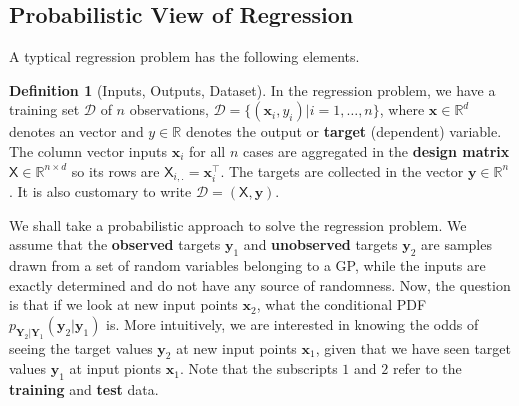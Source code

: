 \documentclass[10pt]{article}
\theoremstyle{definition}
\newtheorem{defn}{Definition}[section]
\theoremstyle{definition}
\theoremstyle{remark}
\begin{document}
\subsection{Probabilistic View of Regression}
A typtical regression problem has the following elements.
\begin{defn}[Inputs, Outputs, Dataset]
In the regression problem, we have a training set $\mathcal{D}$ of $n$ observations, $\mathcal{D}=\{(\mathbf{x}_i, y_i)|i=1,\dots,n\}$, where $\mathbf{x}\in\mathbb{R}^{d}$ denotes an  vector and $y\in\mathbb{R}$ denotes the output or \textbf{target} (dependent) variable. The column vector inputs $\mathbf{x}_i$ for all $n$ cases are aggregated in the \textbf{design matrix} $\mathsf{X}\in \mathbb{R}^{n\times d}$ so its rows are $\mathsf{X}_{i,.}=\mathbf{x}_i^{\top}$. The targets are collected in the vector $\mathbf{y}\in\mathbb{R}^n$. It is also customary to write $\mathcal{D}=(\mathsf{X}, \mathbf{y})$.
\end{defn}
We shall take a probabilistic approach to solve the regression problem. We assume that the \textbf{observed} targets $\mathbf{y}_1$ and \textbf{unobserved} targets $\mathbf{y}_2$ are samples drawn from a set of random variables belonging to a GP, while the inputs are exactly determined and do not have any source of randomness. Now, the question is that if we look at new input points $\mathbf{x}_2$, what the conditional PDF $p_{\mathbf{Y}_2|\mathbf{Y}_1}(\mathbf{y}_2|\mathbf{y}_1)$ is. More intuitively, we are interested in knowing the odds of seeing the target values $\mathbf{y}_2$ at new input points $\mathbf{x}_1$, given that we have seen target values $\mathbf{y}_1$ at input pionts $\mathbf{x}_1$. Note that the subscripts $1$ and $2$ refer to the \textbf{training} and \textbf{test} data.
\end{document}
